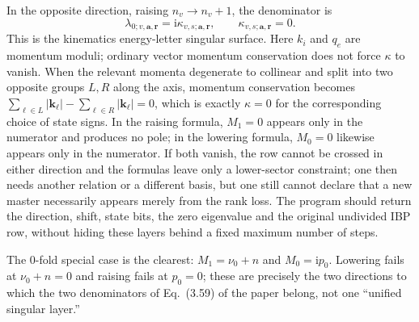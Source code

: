 \documentclass[11pt,a4paper]{article}
\newcommand{\ii}{\mathrm i}
\begin{document}
In the opposite direction, raising $n_v\to n_v+1$, the denominator is
\begin{equation}
 \lambda_{0;v,\bm a,\bm r}
 =\ii\kappa_{v,s;\bm a,\bm r},
 \qquad
 \kappa_{v,s;\bm a,\bm r}=0.
 \label{eq:M0-raising-resonance}
\end{equation}
This is the kinematics energy-letter singular surface. Here $k_i$ and $q_e$ are momentum moduli; ordinary vector momentum conservation does not force $\kappa$ to vanish. When the relevant momenta degenerate to collinear and split into two opposite groups $L,R$ along the axis, momentum conservation becomes $\sum_{\ell\in L}|\bm k_\ell|-\sum_{\ell\in R}|\bm k_\ell|=0$, which is exactly $\kappa=0$ for the corresponding choice of state signs. In the raising formula, $M_1=0$ appears only in the numerator and produces no pole; in the lowering formula, $M_0=0$ likewise appears only in the numerator. If both vanish, the row cannot be crossed in either direction and the formulas leave only a lower-sector constraint; one then needs another relation or a different basis, but one still cannot declare that a new master necessarily appears merely from the rank loss. The program should return the direction, shift, state bits, the zero eigenvalue and the original undivided IBP row, without hiding these layers behind a fixed maximum number of steps.

The $0$-fold special case is the clearest: $M_1=\nu_0+n$ and $M_0=\ii p_0$. Lowering fails at $\nu_0+n=0$ and raising fails at $p_0=0$; these are precisely the two directions to which the two denominators of Eq.~(3.59) of the paper belong, not one ``unified singular layer.''
\end{document}
